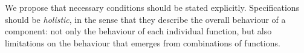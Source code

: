  We propose that  necessary conditions should be stated
 explicitly. Specifications should be \emph{holistic}, in the sense
 that they describe the  overall behaviour of a component: not only the
 behaviour of each individual function, but also limitations on the
 behaviour that emerges from combinations of functions.
%
%
%
